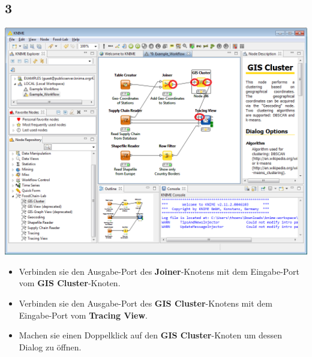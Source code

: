 \documentclass{beamer}
\begin{document}
\subsection{3}
\begin{frame}
	\begin{center}
  		\includegraphics[height=0.6\textheight]{3.png}
	\end{center}
	\begin{itemize}
		\item Verbinden sie den Ausgabe-Port des \textbf{Joiner}-Knotens mit dem Eingabe-Port vom \textbf{GIS Cluster}-Knoten.
		\item Verbinden sie den Ausgabe-Port des \textbf{GIS Cluster}-Knotens mit dem Eingabe-Port vom \textbf{Tracing View}.
		\item Machen sie einen Doppelklick auf den \textbf{GIS Cluster}-Knoten um dessen Dialog zu öffnen.
	\end{itemize}
\end{frame}
\end{document}
